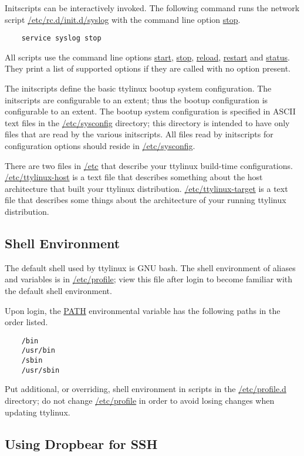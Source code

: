 \documentclass[10pt]{article}
\begin{document}
Initscripts can be interactively invoked. The following command runs the network
script \url{/etc/rc.d/init.d/syslog} with the command line option \url{stop}.

\begin{lstlisting}
	service syslog stop
\end{lstlisting}

All scripts use the command line options \url{start}, \url{stop}, \url{reload},
\url{restart} and \url{status}. They print a list of supported options if they
are called with no option present.

The initscripts define the basic ttylinux bootup system configuration. The
initscripts are configurable to an extent; thus the bootup configuration is
configurable to an extent. The bootup system configuration is specified in
ASCII text files in the \url{/etc/sysconfig} directory; this directory is
intended to have only files that are read by the various initscripts. All files
read by initscripts for configuration options should reside in
\url{/etc/sysconfig}.

There are two files in \url{/etc} that describe your ttylinux build-time
configurations. \url{/etc/ttylinux-host} is a text file that describes
something about the host architecture that built your ttylinux distribution.
\url{/etc/ttylinux-target} is a text file that describes some things about the
architecture of your running ttylinux distribution.

\subsection{Shell Environment}

The default shell used by ttylinux is GNU bash. The shell environment of
aliases and variables is in \url{/etc/profile}; view this file after login to
become familiar with the default shell environment.

Upon login, the \url{PATH} environmental variable has the following paths in
the order listed.

\begin{lstlisting}
	/bin
	/usr/bin
	/sbin
	/usr/sbin
\end{lstlisting}

Put additional, or overriding, shell environment in scripts in the
\url{/etc/profile.d} directory; do not change \url{/etc/profile} in order to
avoid losing changes when updating ttylinux.

\subsection{Using Dropbear for SSH}
\label{dropbear}
\end{document}
